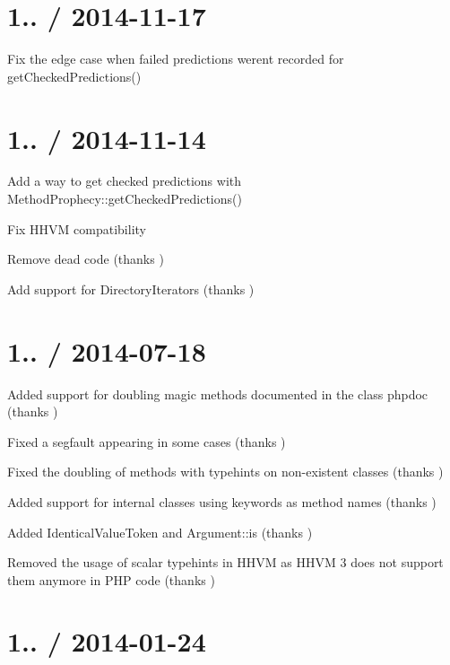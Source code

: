 \section*{1.. / 2014-\/11-\/17 }


\begin{DoxyItemize}
\item Fix the edge case when failed predictions weren\textquotesingle{}t recorded for {\ttfamily get\+Checked\+Predictions()}
\end{DoxyItemize}

\section*{1.. / 2014-\/11-\/14 }


\begin{DoxyItemize}
\item Add a way to get checked predictions with {\ttfamily Method\+Prophecy\+::get\+Checked\+Predictions()}
\item Fix H\+H\+VM compatibility
\item Remove dead code (thanks )
\item Add support for Directory\+Iterators (thanks )
\end{DoxyItemize}

\section*{1.. / 2014-\/07-\/18 }


\begin{DoxyItemize}
\item Added support for doubling magic methods documented in the class phpdoc (thanks )
\item Fixed a segfault appearing in some cases (thanks )
\item Fixed the doubling of methods with typehints on non-\/existent classes (thanks )
\item Added support for internal classes using keywords as method names (thanks )
\item Added Identical\+Value\+Token and Argument\+::is (thanks )
\item Removed the usage of scalar typehints in H\+H\+VM as H\+H\+VM 3 does not support them anymore in P\+HP code (thanks )
\end{DoxyItemize}

\section*{1.. / 2014-\/01-\/24 }


